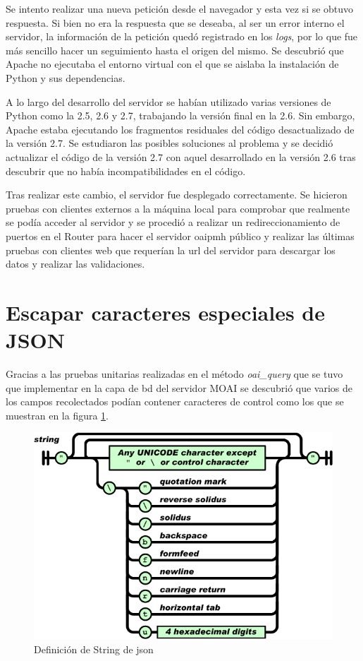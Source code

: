 Se intento realizar una nueva petición desde el navegador y esta vez si se obtuvo respuesta. Si bien no era la respuesta que se deseaba, al ser un error interno el servidor, la información de la petición quedó registrado en los \textit{logs}, por lo que fue más sencillo hacer un seguimiento hasta el origen del mismo. Se descubrió que Apache no ejecutaba el entorno virtual con el que se aislaba la instalación de Python y sus dependencias. 

A lo largo del desarrollo del servidor se habían utilizado varias versiones de Python como la 2.5, 2.6 y 2.7, trabajando la versión final en la 2.6. Sin embargo, Apache estaba ejecutando los fragmentos residuales del código desactualizado de la versión 2.7. Se estudiaron las posibles soluciones al problema y se decidió actualizar el código de la versión 2.7 con aquel desarrollado en la versión 2.6 tras descubrir que no había incompatibilidades en el código.

Tras realizar este cambio, el servidor fue desplegado correctamente. Se hicieron pruebas con clientes externos a la máquina local para comprobar que realmente se podía acceder al servidor y se procedió a realizar un redireccionamiento de puertos en el Router para hacer el servidor \acrshort{oaipmh} público y realizar las últimas pruebas con clientes web que requerían la \acrshort{url} del servidor para descargar los datos y realizar las validaciones.

\section{Escapar caracteres especiales de JSON}

Gracias a las pruebas unitarias realizadas en el método \textit{oai\_query} que se tuvo que implementar en la capa de \acrshort{bd} del servidor MOAI se descubrió que varios de los campos recolectados podían contener caracteres de control como los que se muestran en la figura \ref{fig:json_string}.

\begin{figure}[!htbp]
	\centering
	\includegraphics[scale=0.5]{fig/json_string}
	\caption{Definición de String de \acrshort{json}}
	\label{fig:json_string}
\end{figure}

